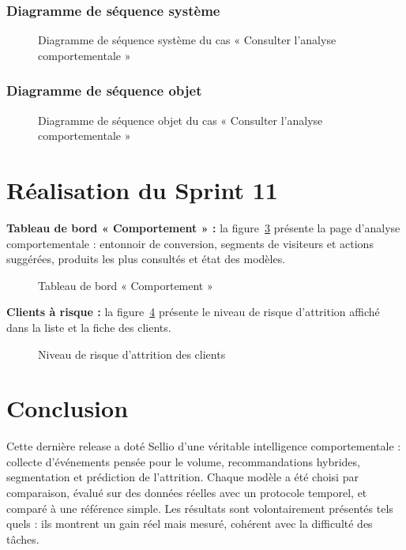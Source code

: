 \subsubsection{Diagramme de séquence système}
\begin{figure}[H]
    \centering
    \caption{Diagramme de séquence système du cas « Consulter l'analyse comportementale »}
    \label{fig:dss-comportement}
\end{figure}

\subsubsection{Diagramme de séquence objet}
\begin{figure}[H]
    \centering
    \caption{Diagramme de séquence objet du cas « Consulter l'analyse comportementale »}
    \label{fig:dso-comportement}
\end{figure}
\clearpage
\section{Réalisation du Sprint 11}
\textbf{Tableau de bord « Comportement » :} la figure~\ref{fig:ui-comportement} présente la page d'analyse comportementale : entonnoir de conversion, segments de visiteurs et actions suggérées, produits les plus consultés et état des modèles.
\begin{figure}[H]
    \centering
    \caption{Tableau de bord « Comportement »}
    \label{fig:ui-comportement}
\end{figure}

\textbf{Clients à risque :} la figure~\ref{fig:ui-churn} présente le niveau de risque d'attrition affiché dans la liste et la fiche des clients.
\begin{figure}[H]
    \centering
    \caption{Niveau de risque d'attrition des clients}
    \label{fig:ui-churn}
\end{figure}

\section*{Conclusion}
Cette dernière release a doté Sellio d'une véritable intelligence comportementale : collecte d'événements pensée pour le volume, recommandations hybrides, segmentation et prédiction de l'attrition. Chaque modèle a été choisi par comparaison, évalué sur des données réelles avec un protocole temporel, et comparé à une référence simple. Les résultats sont volontairement présentés tels quels : ils montrent un gain réel mais mesuré, cohérent avec la difficulté des tâches.
